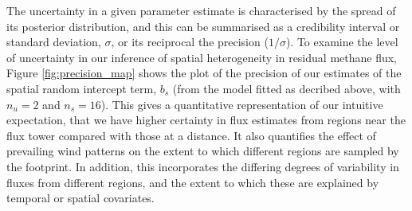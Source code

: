 The uncertainty in a given parameter estimate is characterised by the
spread of its posterior distribution, and this can be summarised as a
credibility interval or standard deviation, \(\sigma\), or its
reciprocal the precision (\(1 / \sigma\)). To examine the level of
uncertainty in our inference of spatial heterogeneity in residual
methane flux, Figure \ref{fig:precision_map} shows the plot of the
precision of our estimates of the spatial random intercept term, \(b_s\)
(from the model fitted as decribed above, with \(n_u = 2\) and
\(n_s = 16\)). This gives a quantitative representation of our intuitive
expectation, that we have higher certainty in flux estimates from
regions near the flux tower compared with those at a distance. It also
quantifies the effect of prevailing wind patterns on the extent to which
different regions are sampled by the footprint. In addition, this
incorporates the differing degrees of variability in fluxes from
different regions, and the extent to which these are explained by
temporal or spatial covariates.